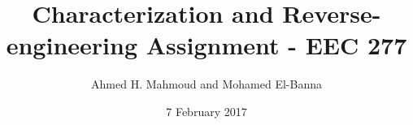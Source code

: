 \documentclass[12pt] {article}
\begin{document}
\title{Characterization and Reverse-engineering Assignment - EEC 277}
\author{Ahmed H. Mahmoud and Mohamed El-Banna}
\date{7 February 2017} 
\maketitle




\newpage



\newpage



\newpage





\end{document}
